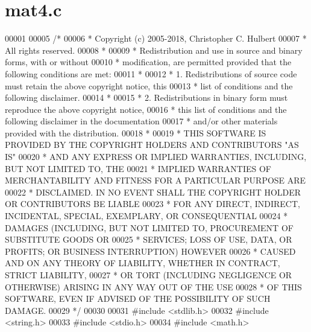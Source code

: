 \hypertarget{mat4_8c_source}{}\section{mat4.\+c}
\label{mat4_8c_source}

\begin{DoxyCode}
00001 
00005 \textcolor{comment}{/*}
00006 \textcolor{comment}{ * Copyright (c) 2005-2018, Christopher C. Hulbert}
00007 \textcolor{comment}{ * All rights reserved.}
00008 \textcolor{comment}{ *}
00009 \textcolor{comment}{ * Redistribution and use in source and binary forms, with or without}
00010 \textcolor{comment}{ * modification, are permitted provided that the following conditions are met:}
00011 \textcolor{comment}{ *}
00012 \textcolor{comment}{ * 1. Redistributions of source code must retain the above copyright notice, this}
00013 \textcolor{comment}{ *    list of conditions and the following disclaimer.}
00014 \textcolor{comment}{ *}
00015 \textcolor{comment}{ * 2. Redistributions in binary form must reproduce the above copyright notice,}
00016 \textcolor{comment}{ *    this list of conditions and the following disclaimer in the documentation}
00017 \textcolor{comment}{ *    and/or other materials provided with the distribution.}
00018 \textcolor{comment}{ *}
00019 \textcolor{comment}{ * THIS SOFTWARE IS PROVIDED BY THE COPYRIGHT HOLDERS AND CONTRIBUTORS "AS IS"}
00020 \textcolor{comment}{ * AND ANY EXPRESS OR IMPLIED WARRANTIES, INCLUDING, BUT NOT LIMITED TO, THE}
00021 \textcolor{comment}{ * IMPLIED WARRANTIES OF MERCHANTABILITY AND FITNESS FOR A PARTICULAR PURPOSE ARE}
00022 \textcolor{comment}{ * DISCLAIMED. IN NO EVENT SHALL THE COPYRIGHT HOLDER OR CONTRIBUTORS BE LIABLE}
00023 \textcolor{comment}{ * FOR ANY DIRECT, INDIRECT, INCIDENTAL, SPECIAL, EXEMPLARY, OR CONSEQUENTIAL}
00024 \textcolor{comment}{ * DAMAGES (INCLUDING, BUT NOT LIMITED TO, PROCUREMENT OF SUBSTITUTE GOODS OR}
00025 \textcolor{comment}{ * SERVICES; LOSS OF USE, DATA, OR PROFITS; OR BUSINESS INTERRUPTION) HOWEVER}
00026 \textcolor{comment}{ * CAUSED AND ON ANY THEORY OF LIABILITY, WHETHER IN CONTRACT, STRICT LIABILITY,}
00027 \textcolor{comment}{ * OR TORT (INCLUDING NEGLIGENCE OR OTHERWISE) ARISING IN ANY WAY OUT OF THE USE}
00028 \textcolor{comment}{ * OF THIS SOFTWARE, EVEN IF ADVISED OF THE POSSIBILITY OF SUCH DAMAGE.}
00029 \textcolor{comment}{ */}
00030 
00031 \textcolor{preprocessor}{#include <stdlib.h>}
00032 \textcolor{preprocessor}{#include <string.h>}
00033 \textcolor{preprocessor}{#include <stdio.h>}
00034 \textcolor{preprocessor}{#include <math.h>}

\end{DoxyCode}
